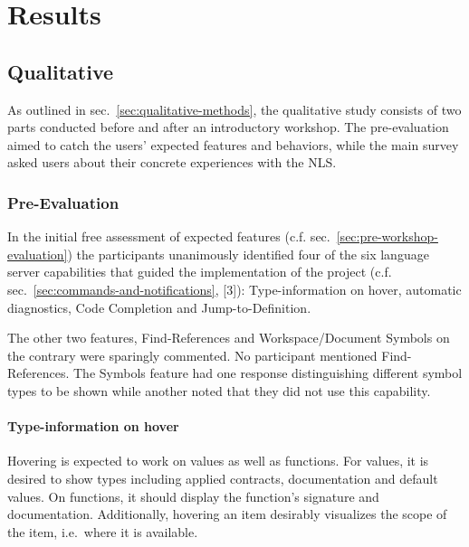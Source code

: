 \documentclass[
  a4paper,
  bibtex,
  english,
  nomenclature]{kthlatex/kththesis/kththesis}
\begin{document}
\hypertarget{sec:results}{%
\section{Results}\label{sec:results}}

\hypertarget{sec:qualitative}{%
\subsection{Qualitative}\label{sec:qualitative}}

As outlined in sec.~\ref{sec:qualitative-methods}, the qualitative study
consists of two parts conducted before and after an introductory
workshop. The pre-evaluation aimed to catch the users' expected features
and behaviors, while the main survey asked users about their concrete
experiences with the NLS.

\hypertarget{sec:pre-evaluation}{%
\subsubsection{Pre-Evaluation}\label{sec:pre-evaluation}}

In the initial free assessment of expected features (c.f.
sec.~\ref{sec:pre-workshop-evaluation}) the participants unanimously
identified four of the six language server capabilities that guided the
implementation of the project (c.f.
sec.~\ref{sec:commands-and-notifications}, {[}3{]}): Type-information on
hover, automatic diagnostics, Code Completion and Jump-to-Definition.

The other two features, Find-References and Workspace/Document Symbols
on the contrary were sparingly commented. No participant mentioned
Find-References. The Symbols feature had one response distinguishing
different symbol types to be shown while another noted that they did not
use this capability.

\hypertarget{sec:type-information-on-hover}{%
\paragraph{Type-information on
hover}\label{sec:type-information-on-hover}}

Hovering is expected to work on values as well as functions. For values,
it is desired to show types including applied contracts, documentation
and default values. On functions, it should display the function's
signature and documentation. Additionally, hovering an item desirably
visualizes the scope of the item, i.e.~where it is available.
\end{document}
